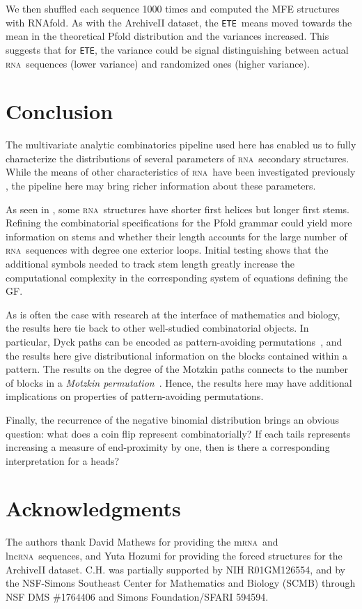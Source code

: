 \documentclass{article}
\newcommand{\RNA}{\textsc{rna}}
\newcommand{\rna}{\textsc{rna}}
\newcommand{\ETE}{{\tt ETE}}
\begin{document}
We then shuffled each sequence 1000 times and computed the MFE structures with RNAfold.  As with the ArchiveII dataset, the \ETE\ means moved towards the mean in the theoretical Pfold distribution and the variances increased.  This suggests that for \ETE, the variance could be signal distinguishing between actual \RNA\ sequences (lower variance) and randomized ones (higher variance).

\section{Conclusion} \label{sec:Conclusion}

The multivariate analytic combinatorics pipeline used here has enabled us to fully characterize the distributions of several parameters of \rna\ secondary structures. While the means of other characteristics of \rna\ have been investigated previously \cite{Hofacker:1998}, the pipeline here may bring richer information about these parameters.

As seen in , some \rna\ structures have shorter first helices but longer first stems.  Refining the combinatorial specifications for the Pfold grammar could yield more information on stems and whether their length accounts for the large number of \rna\ sequences with degree one exterior loops.  Initial testing shows that the additional symbols needed to track stem length greatly increase the computational complexity in the corresponding system of equations defining the GF.

As is often the case with research at the interface of mathematics and biology, the results here tie back to other well-studied combinatorial objects.  In particular, Dyck paths can be encoded as pattern-avoiding permutations~\cite{Krattenthaler:2001, Adin:2018}, and the results here give distributional information on the blocks contained within a pattern.  The results on the degree of the Motzkin paths connects to the number of blocks in a \emph{Motzkin permutation}~\cite{Elizalde:2005}.  Hence, the results here may have additional implications on properties of pattern-avoiding permutations.

Finally, the recurrence of the negative binomial distribution brings an obvious question: what does a coin flip represent combinatorially?  If each tails represents increasing a measure of end-proximity by one, then is there a corresponding interpretation for a heads?


\section*{Acknowledgments} The authors thank David Mathews for providing the m\rna\ and lnc\rna\ sequences, and Yuta Hozumi for providing the forced structures for the ArchiveII dataset. C.H. was partially supported by NIH R01GM126554, and by the NSF-Simons Southeast Center for Mathematics and Biology (SCMB) through
NSF DMS \#1764406 and Simons Foundation/SFARI 594594.
\end{document}
